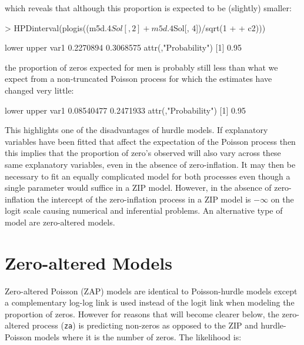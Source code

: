 \documentclass{article}
\begin{document}
which reveals that although this proportion is expected to be (slightly) smaller: 


\begin{Schunk}
\begin{Sinput}
> HPDinterval(plogis((m5d.4$Sol[, 2] + m5d.4$Sol[, 4])/sqrt(1 + 
+     c2)))
\end{Sinput}
\begin{Soutput}
         lower     upper
var1 0.2270894 0.3068575
attr(,"Probability")
[1] 0.95
\end{Soutput}
\end{Schunk}


the proportion of zeros expected for men is probably still less than what we expect from a non-truncated Poisson process for which the estimates have changed very little:

\begin{Schunk}
\begin{Soutput}
          lower     upper
var1 0.08540477 0.2471933
attr(,"Probability")
[1] 0.95
\end{Soutput}
\end{Schunk}


This highlights one of the disadvantages of hurdle models. If explanatory variables have been fitted that affect the expectation of the Poisson process then this implies that the proportion of zero's observed will also vary across these same explanatory variables, even in the absence of zero-inflation. It may then be necessary to fit an equally complicated model for both processes even though a single parameter would suffice in a ZIP model. However, in the absence of zero-inflation the intercept of the zero-inflation process in a ZIP model is $-\infty$ on the logit scale causing numerical and inferential problems. An alternative type of model are zero-altered models. 

\section{Zero-altered Models}
\label{ZAP}

Zero-altered Poisson (ZAP) models are identical to Poisson-hurdle models except a complementary log-log link is used instead of the logit link when modeling the proportion of zeros. However for reasons that will become clearer below, the zero-altered process (\texttt{za}) is predicting non-zeros as opposed to the ZIP and hurdle-Poisson models where it is the number of zeros.  The likelihood is:
\end{document}
